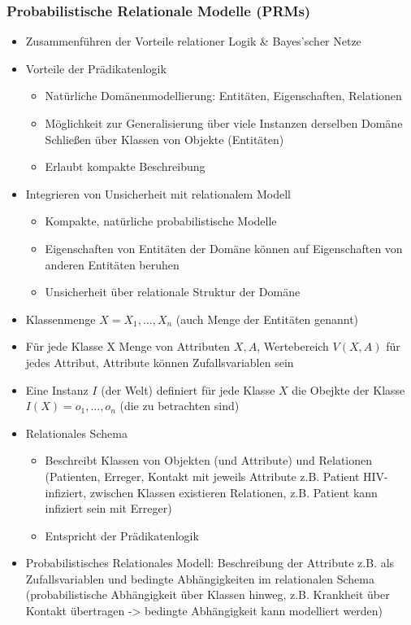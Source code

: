 \documentclass[paper=a4, fontsize=11pt]{scrartcl} %
\numberwithin{equation}{section} %
\numberwithin{figure}{section} %
\numberwithin{table}{section} %
\begin{document}
\subsubsection{Probabilistische Relationale Modelle (PRMs)}

\begin{itemize}
\item Zusammenführen der Vorteile relationer Logik \& Bayes'scher Netze
\item Vorteile der Prädikatenlogik
\begin{itemize}
\item Natürliche Domänenmodellierung: Entitäten, Eigenschaften, Relationen
\item Möglichkeit zur Generalisierung über viele Instanzen derselben Domäne Schließen über Klassen von Objekte (Entitäten)
\item Erlaubt kompakte Beschreibung
\end{itemize}
\item Integrieren von Unsicherheit mit relationalem Modell
\begin{itemize}
\item Kompakte, natürliche probabilistische Modelle
\item Eigenschaften von Entitäten der Domäne können auf Eigenschaften von anderen Entitäten beruhen
\item Unsicherheit über relationale Struktur der Domäne
\end{itemize}
\item Klassenmenge $X={X_1,...,X_n}$ (auch Menge der Entitäten genannt)
\item Für jede Klasse X Menge von Attributen $X,A$, Wertebereich $V(X,A)$ für jedes Attribut, Attribute können Zufallsvariablen sein
\item Eine Instanz $I$ (der Welt) definiert für jede Klasse $X$ die Obejkte der Klasse $I(X) = {o_1,...,o_n}$ (die zu betrachten sind)
\item Relationales Schema
\begin{itemize}
\item Beschreibt Klassen von Objekten (und Attribute) und Relationen (Patienten, Erreger, Kontakt mit jeweils Attribute z.B. Patient HIV-infiziert, zwischen Klassen existieren Relationen, z.B. Patient kann infiziert sein mit Erreger)
\item Entspricht der Prädikatenlogik
\end{itemize}
\item Probabilistisches Relationales Modell: Beschreibung der Attribute z.B. als Zufallsvariablen und bedingte Abhängigkeiten im relationalen Schema (probabilistische Abhängigkeit über Klassen hinweg, z.B. Krankheit über Kontakt übertragen -> bedingte Abhängigkeit kann modelliert werden)

\end{itemize}
\end{document}
